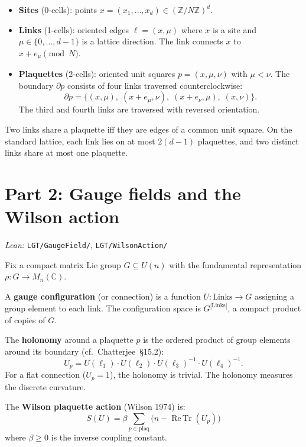 \documentclass[11pt,a4paper]{article}
\theoremstyle{definition}
\newcommand{\ReTr}{\operatorname{Re\,Tr}}
\begin{document}
\begin{itemize}
\item \textbf{Sites} (0-cells): points
  $x = (x_1, \ldots, x_d) \in (\mathbb{Z}/N\mathbb{Z})^d$.
\item \textbf{Links} (1-cells): oriented edges
  $\ell = (x, \mu)$ where $x$ is a site and
  $\mu \in \{0, \ldots, d{-}1\}$ is a lattice direction.
  The link connects $x$ to $x + e_\mu \pmod{N}$.
\item \textbf{Plaquettes} (2-cells): oriented unit squares
  $p = (x, \mu, \nu)$ with $\mu < \nu$. The boundary
  $\partial p$ consists of four links traversed counterclockwise:
  \[
    \partial p = \bigl\{
      (x, \mu),\;
      (x{+}e_\mu, \nu),\;
      (x{+}e_\nu, \mu),\;
      (x, \nu)
    \bigr\}.
  \]
  The third and fourth links are traversed with reversed orientation.
\end{itemize}

Two links share a plaquette iff they are edges of a common unit
square. On the standard lattice, each link lies on at most
$2(d{-}1)$ plaquettes, and two distinct links share at most one
plaquette.

\section{Part 2: Gauge fields and the Wilson action}

\textit{Lean:} \texttt{LGT/GaugeField/}, \texttt{LGT/WilsonAction/}

\medskip

Fix a compact matrix Lie group $G \subseteq U(n)$ with the
fundamental representation $\rho\colon G \to M_n(\mathbb{C})$.

A \textbf{gauge configuration} (or connection) is a function
$U\colon \text{Links} \to G$ assigning a group element to each
link. The configuration space is $G^{|\text{Links}|}$, a compact
product of copies of $G$.

The \textbf{holonomy} around a plaquette $p$ is the ordered product
of group elements around its boundary
(cf.\ Chatterjee~\S15.2):
\[
  U_p = U(\ell_1) \cdot U(\ell_2)
        \cdot U(\ell_3)^{-1} \cdot U(\ell_4)^{-1}.
\]
For a flat connection ($U_p = 1$), the holonomy is trivial.
The holonomy measures the discrete curvature.

The \textbf{Wilson plaquette action} (Wilson 1974) is:
\[
  S(U) = \beta \sum_{p \in \text{plaq}}
    \bigl(n - \ReTr(U_p)\bigr)
\]
where $\beta \geq 0$ is the inverse coupling constant.
\end{document}
